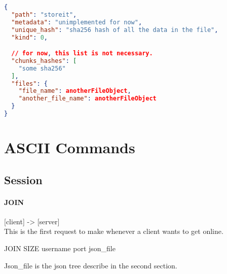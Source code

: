 \documentclass{article}
\begin{document}


\begin{lstlisting}[language=json,firstnumber=1]
{
  "path": "storeit",
  "metadata": "unimplemented for now",
  "unique_hash": "sha256 hash of all the data in the file",
  "kind": 0,

  // for now, this list is not necessary.
  "chunks_hashes": [
    "some sha256"
  ],
  "files": {
    "file_name": anotherFileObject,
    "another_file_name": anotherFileObject
  }
}
\end{lstlisting}

\section{ASCII Commands}

\subsection{Session}

\paragraph{JOIN}

[client] -> [server]\\
This is the first request to make whenever a client wants to get online.\\
\begin{center}JOIN SIZE username port json\_file\end{center}
Json\_file is the json tree describe in the second section.
\end{document}
